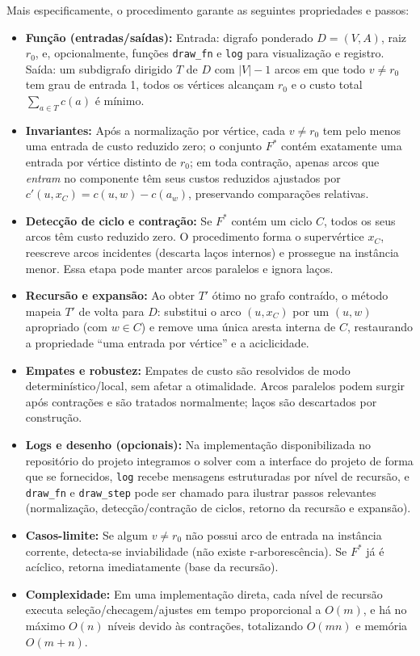 Mais especificamente, o procedimento garante as seguintes propriedades e passos:
\begin{itemize}\setlength{\itemsep}{2pt}
    \item \textbf{Função (entradas/saídas):} Entrada: digrafo ponderado \(D=(V,A)\), raiz \(r_0\), e, opcionalmente, funções \texttt{draw\_fn} e \texttt{log} para visualização e registro. Saída: um subdigrafo dirigido \(T\) de \(D\) com \(|V|-1\) arcos em que todo \(v\neq r_0\) tem grau de entrada 1, todos os vértices alcançam \(r_0\) e o custo total \(\sum_{a\in T} c(a)\) é mínimo.
    \item \textbf{Invariantes:} Após a normalização por vértice, cada \(v\neq r_0\) tem pelo menos uma entrada de custo reduzido zero; o conjunto \(F^*\) contém exatamente uma entrada por vértice distinto de \(r_0\); em toda contração, apenas arcos que \emph{entram} no componente têm seus custos reduzidos ajustados por \(c'(u,x_C)=c(u,w)-c(a_w)\), preservando comparações relativas.
    \item \textbf{Detecção de ciclo e contração:} Se \(F^*\) contém um ciclo \(C\), todos os seus arcos têm custo reduzido zero. O procedimento forma o supervértice \(x_C\), reescreve arcos incidentes (descarta laços internos) e prossegue na instância menor. Essa etapa pode manter arcos paralelos e ignora laços.
    \item \textbf{Recursão e expansão:} Ao obter \(T'\) ótimo no grafo contraído, o método mapeia \(T'\) de volta para \(D\): substitui o arco \((u,x_C)\) por um \((u,w)\) apropriado (com \(w\in C\)) e remove uma única aresta interna de \(C\), restaurando a propriedade “uma entrada por vértice” e a aciclicidade.
    \item \textbf{Empates e robustez:} Empates de custo são resolvidos de modo determinístico/local, sem afetar a otimalidade. Arcos paralelos podem surgir após contrações e são tratados normalmente; laços são descartados por construção.
    \item \textbf{Logs e desenho (opcionais):} Na implementação disponibilizada no repositório do projeto integramos o solver com a interface do projeto de forma que se fornecidos, \texttt{log} recebe mensagens estruturadas por nível de recursão, e \texttt{draw\_fn} e \texttt{draw\_step} pode ser chamado para ilustrar passos relevantes (normalização, detecção/contração de ciclos, retorno da recursão e expansão).
    \item \textbf{Casos-limite:} Se algum \(v\neq r_0\) não possui arco de entrada na instância corrente, detecta-se inviabilidade (não existe r-arborescência). Se \(F^*\) já é acíclico, retorna imediatamente (base da recursão).
    \item \textbf{Complexidade:} Em uma implementação direta, cada nível de recursão executa seleção/checagem/ajustes em tempo proporcional a \(O(m)\), e há no máximo \(O(n)\) níveis devido às contrações, totalizando \(O(mn)\) e memória \(O(m+n)\).
\end{itemize}

